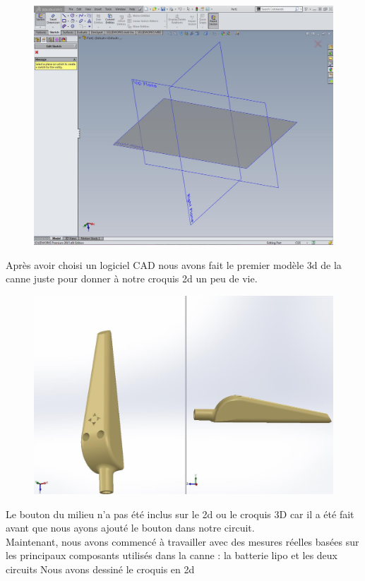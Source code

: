 \begin{figure}[!htbp]
    \centering
    \includegraphics[width=\linewidth]{assets/conception1/img135.jpg}
\end{figure}

\FloatBarrier

Après avoir choisi un logiciel CAD nous avons fait le premier modèle 3d de la canne juste pour donner à notre  croquis 2d un peu de vie.

\begin{figure}[!htbp]
    \centering
    \includegraphics[width=\linewidth]{assets/conception1/img138.jpg}
\end{figure}

\FloatBarrier

Le bouton du milieu n’a pas été inclus sur le 2d ou le croquis 3D car il a été fait avant que nous ayons  ajouté le bouton dans notre circuit. \\
Maintenant, nous avons commencé à travailler avec des mesures réelles basées sur les principaux composants utilisés dans la canne : la batterie lipo et les deux circuits 
Nous avons dessiné le croquis en 2d

